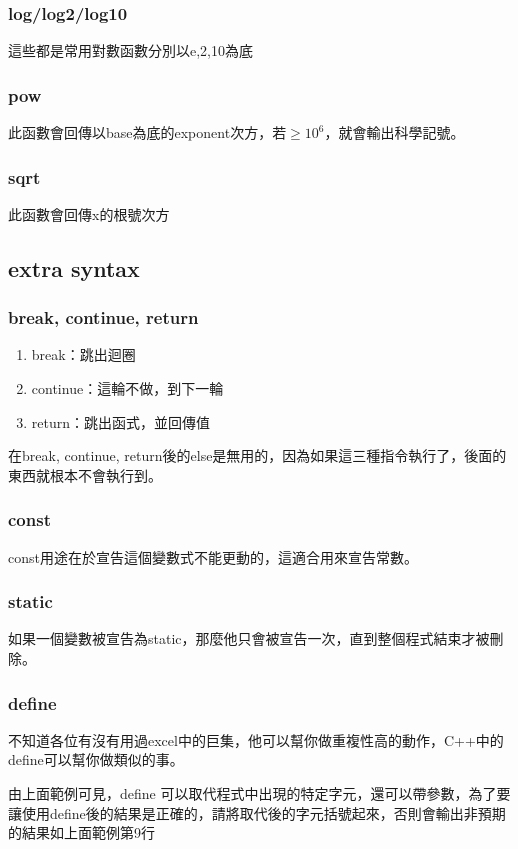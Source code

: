 \subsubsection{log/log2/log10}
這些都是常用對數函數分別以e,2,10為底

\subsubsection{pow}
此函數會回傳以base為底的exponent次方，若$\geq 10^6$，就會輸出科學記號。

\subsubsection{sqrt}
此函數會回傳x的根號次方

\subsection{extra syntax}
\subsubsection{break, continue, return}
\begin{enumerate}
\item break：跳出迴圈
\item continue：這輪不做，到下一輪
\item return：跳出函式，並回傳值
\end{enumerate}
在break, continue, return後的else是無用的，因為如果這三種指令執行了，後面的東西就根本不會執行到。
\subsubsection{const}
const用途在於宣告這個變數式不能更動的，這適合用來宣告常數。

\subsubsection{static}
如果一個變數被宣告為static，那麼他只會被宣告一次，直到整個程式結束才被刪除。

\subsubsection{define}
不知道各位有沒有用過excel中的巨集，他可以幫你做重複性高的動作，C++中的define可以幫你做類似的事。

由上面範例可見，define 可以取代程式中出現的特定字元，還可以帶參數，為了要讓使用define後的結果是正確的，請將取代後的字元括號起來，否則會輸出非預期的結果如上面範例第9行

